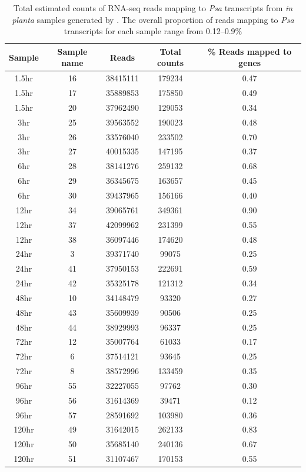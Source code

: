 \begin{table}[H]
    \centering
    \begin{tabular}{ccccc}\toprule
    Sample & Sample name & Reads & Total counts & \% Reads mapped to genes \\\midrule
1.5hr & 16 & 38415111 & 179234 & 0.47 \\
1.5hr & 17 & 35889853 & 175850 & 0.49 \\
1.5hr & 20 & 37962490 & 129053 & 0.34 \\
3hr & 25 & 39563552 & 190023 & 0.48 \\
3hr & 26 & 33576040 & 233502 & 0.70 \\
3hr & 27 & 40015335 & 147195 & 0.37 \\
6hr & 28 & 38141276 & 259132 & 0.68 \\
6hr & 29 & 36345675 & 163657 & 0.45 \\
6hr & 30 & 39437965 & 156166 & 0.40 \\
12hr & 34 & 39065761 & 349361 & 0.90 \\
12hr & 37 & 42099962 & 231399 & 0.55 \\
12hr & 38 & 36097446 & 174620 & 0.48 \\
24hr & 3 & 39371740 & 99075 & 0.25 \\
24hr & 41 & 37950153 & 222691 & 0.59 \\
24hr & 42 & 35325178 & 121312 & 0.34 \\
48hr & 10 & 34148479 & 93320 & 0.27 \\
48hr & 43 & 35609939 & 90506 & 0.25 \\
48hr & 44 & 38929993 & 96337 & 0.25 \\
72hr & 12 & 35007764 & 61033 & 0.17 \\
72hr & 6 & 37514121 & 93645 & 0.25 \\
72hr & 8 & 38572996 & 133459 & 0.35 \\
96hr & 55 & 32227055 & 97762 & 0.30 \\
96hr & 56 & 31614369 & 39471 & 0.12 \\
96hr & 57 & 28591692 & 103980 & 0.36 \\
120hr & 49 & 31642015 & 262133 & 0.83 \\
120hr & 50 & 35685140 & 240136 & 0.67 \\
120hr & 51 & 31107467 & 170153 & 0.55 \\
\bottomrule
    \end{tabular}
    \caption[\textit{In planta} read mapping statistics]{Total estimated counts of RNA-seq reads mapping to \textit{Psa} transcripts from \textit{in planta} samples generated by \cite{McAtee2018-sl}.  The overall proportion of reads mapping to \textit{Psa} transcripts for each sample range from 0.12--0.9\%}
    \label{tab:my_label}
\end{table}

